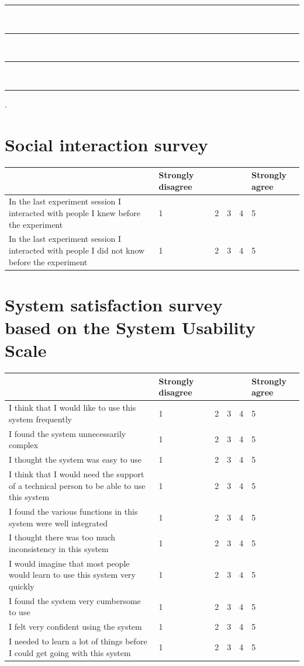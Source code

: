 \documentclass[a4paper,11pt]{article}
\begin{document}
\begin{appendices}
\begin{enumerate}[resume]
	\rule{4.5in}{.5pt} \\
	\rule{4.5in}{.5pt} \\
	\rule{4.5in}{.5pt} \\
	\rule{4.5in}{.5pt}.

\end{enumerate}

\section{Social interaction survey}

\begin{tabularx}{\textwidth}{p{2in} | Y Y Y Y Y }
	& Strongly disagree & & & & Strongly agree \\
	\hline
	In the last experiment session I interacted with people I knew before the experiment & 1 & 2 & 3 & 4 & 5 \\
	\hline
	In the last experiment session I interacted with people I did not know before the experiment & 1 & 2 & 3 & 4 & 5 \\
\end{tabularx}

\section[System satisfaction survey]{System satisfaction survey\\
	{\normalsize based on the System Usability Scale}}

\begin{tabularx}{\textwidth}{p{2in} | Y Y Y Y Y }
	& Strongly disagree & & & & Strongly agree \\
	\hline
	I think that I would like to use this system frequently & 1 & 2 & 3 & 4 & 5 \\
	\hline
	I found the system unnecessarily complex & 1 & 2 & 3 & 4 & 5 \\
	\hline
	I thought the system was easy to use & 1 & 2 & 3 & 4 & 5 \\
	\hline
	I think that I would need the support of a technical person to be able to use this system & 1 & 2 & 3 & 4 & 5 \\
	\hline
	I found the various functions in this system were well integrated & 1 & 2 & 3 & 4 & 5 \\
	\hline
	I thought there was too much inconsistency in this system & 1 & 2 & 3 & 4 & 5 \\
	\hline
	I would imagine that most people would learn to use this system very quickly & 1 & 2 & 3 & 4 & 5 \\
	\hline
	I found the system very cumbersome to use & 1 & 2 & 3 & 4 & 5 \\
	\hline
	I felt very confident using the system & 1 & 2 & 3 & 4 & 5 \\
	\hline
	I needed to learn a lot of things before I could get going with this system & 1 & 2 & 3 & 4 & 5 \\
\end{tabularx}

\end{appendices}

\sloppy  %
\printbibliography[title={Bibliography}]
\end{document}
